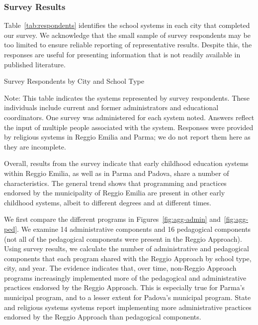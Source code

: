 \subsubsection{Survey Results}

Table~\ref{tab:respondents} identifies the school systems in each city that completed our survey. We acknowledge that the small sample of survey respondents may be too limited to ensure reliable reporting of representative results. Despite this, the responses are useful for presenting information that is not readily available in published literature.

\begin{table}[H]
\centering
\caption{Survey Respondents by City and School Type}\label{tab:respondents}
\begin{threeparttable}
	
\begin{tablenotes}
\footnotesize Note: This table indicates the systems represented by survey respondents. These individuals include current and former administrators and educational coordinators. One survey was administered for each system noted. Answers reflect the input of multiple people associated with the system. Responses were provided by religious systems in Reggio Emilia and Parma; we do not report them here as they are incomplete. \end{tablenotes}
\end{threeparttable}
\end{table}

Overall, results from the survey indicate that early childhood education systems within Reggio Emilia, as well as in Parma and Padova, share a number of characteristics. The general trend shows that programming and practices endorsed by the municipality of Reggio Emilia are present in other early childhood systems, albeit to different degrees and at different times. 

We first compare the different programs in Figures~\ref{fig:agg-admin} and~\ref{fig:agg-ped}. We examine 14 administrative components and 16 pedagogical components (not all of the pedagogical components were present in the Reggio Approach). Using survey results, we calculate the number of administrative and pedagogical components that each program shared with the Reggio Approach by school type, city, and year. The evidence indicates that, over time, non-Reggio Approach programs increasingly implemented more of the pedagogical and administrative practices endorsed by the Reggio Approach. This is especially true for Parma's municipal program, and to a lesser extent for Padova's municipal program. State and religious systems systems report implementing more administrative practices endorsed by the Reggio Approach than pedagogical components. 


